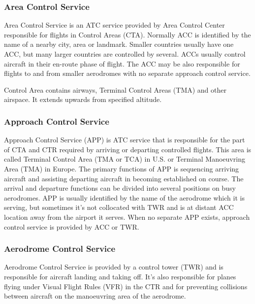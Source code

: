\subsubsection{Area Control Service}

Area Control Service is an ATC service provided by Area Control Center responsible for flights in Control Areas (CTA). Normally ACC is identified by the name of a nearby city, area or landmark. Smaller countries usually have one ACC, but many larger countries are controlled by several. ACCs usually control aircraft in their en-route phase of flight. The ACC may be also responsible for flights to and from smaller aerodromes with no separate approach control service. \cite[Chapter 3.2]{annex11}

Control Area contains airways, Terminal Control Areas (TMA) and other airspace. It extends upwards from specified altitude.

\subsubsection{Approach Control Service}

Approach Control Service (APP) is ATC service that is responsible for the part of CTA and CTR required by arriving or departing controlled flights. This area is called Terminal Control Area (TMA or TCA) in U.S. or Terminal Manoeuvring Area (TMA) in Europe. The primary functions of APP is sequencing arriving aircraft and assisting departing aircraft in becoming established on course. The arrival and departure functions can be divided into several positions on busy aerodromes. APP is usually identified by the name of the aerodrome which it is serving, but sometimes it's not collocated with TWR and is at distant ACC location away from the airport it serves. When no separate APP exists, approach control service is provided by ACC or TWR. \cite[Chapter 3.2]{annex11}

\subsubsection{Aerodrome Control Service}

Aerodrome Control Service is provided by a control tower (TWR) and is responsible for aircraft landing and taking off. It's also responsible for planes flying under Visual Flight Rules (VFR) in the CTR and for preventing collisions between aircraft on the manoeuvring area of the aerodrome. \cite[Chapter 3.2]{annex11}

